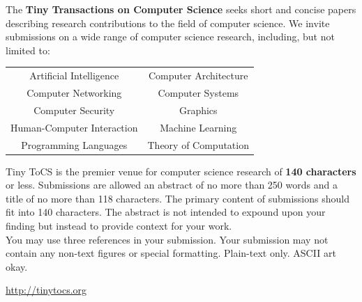 \documentclass[12pt]{article}
\begin{document}
\setlength{\fboxrule}{2pt}
\setlength{\fboxsep}{16pt}
\begin{boxedminipage}{\columnwidth}
\begin{large}
The \textbf{Tiny Transactions on Computer Science} seeks short and concise papers describing research contributions to
the field of computer science. We invite submissions on a wide range of computer science research, including, but not
limited to:

\begin{center}
    \begin{tabular}{cc}
        Artificial Intelligence & Computer Architecture \\
        Computer Networking & Computer Systems \\
        Computer Security   & Graphics \\
        Human-Computer Interaction & Machine Learning \\
        Programming Languages & Theory of Computation \\
    \end{tabular} 
\end{center}

Tiny ToCS is the premier venue for computer science research of \textbf{140 characters} or less. Submissions are
allowed an abstract of no more than 250 words and a title of no more than 118 characters. The primary content of
submissions should fit into 140 characters. The abstract is not intended to expound upon your finding but instead to
provide context for your work. \\

You may use three references in your submission. Your submission may not contain any non-text figures or special
formatting. Plain-text only. ASCII art okay. 

% 
% 
\end{large}
\end{boxedminipage}


\begin{center}
    {\rm {}}
    \vspace*{0.25in}
    {\huge \url{http://tinytocs.org}}
\end{center}
\end{document}
